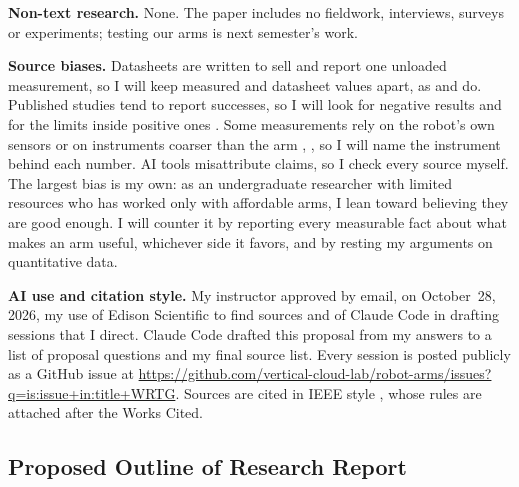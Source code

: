 \textbf{Non-text research.} None. The paper includes no fieldwork, interviews, surveys or
experiments; testing our arms is next semester's work.

\textbf{Source biases.} Datasheets are written to sell and report one unloaded measurement, so
I will keep measured and datasheet values apart, as \cite{rupp2022} and \cite{chajon2026} do.
Published studies tend to report successes, so I will look for negative results
\cite{wattoo2024} and for the limits inside positive ones \cite{rupp2022}. Some measurements
rely on the robot's own sensors or on instruments coarser than the arm \cite{chajon2026},
\cite{zhou2025}, so I will name the instrument behind each number. AI tools misattribute
claims, so I check every source myself. The largest bias is my own: as an undergraduate
researcher with limited resources who has worked only with affordable arms, I lean toward
believing they are good enough. I will counter it by reporting every measurable fact about what
makes an arm useful, whichever side it favors, and by resting my arguments on quantitative
data.

\textbf{AI use and citation style.} My instructor approved by email, on October~28, 2026, my
use of Edison Scientific to find sources and of Claude Code in drafting sessions that I direct.
Claude Code drafted this proposal from my answers to a list of proposal questions and my final
source list. Every session is posted publicly as a GitHub issue at
\url{https://github.com/vertical-cloud-lab/robot-arms/issues?q=is:issue+in:title+WRTG}.
Sources are cited in IEEE style \cite{ieeeguide}, whose rules are attached after the Works
Cited.

\subsection{Proposed Outline of Research Report}

